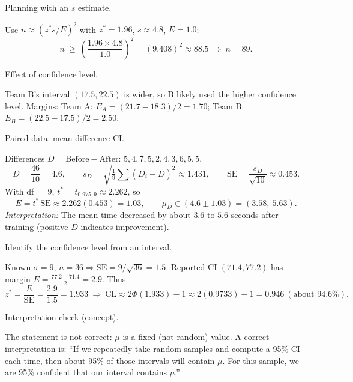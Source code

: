 \documentclass[11pt]{article}
\def\textbf#1{#1}%
\begin{document}
\begin{solution}
\textbf{Planning with an $s$ estimate.}

Use $n\approx (z^{\ast}s/E)^2$ with $z^{\ast}=1.96$, $s\approx 4.8$, $E=1.0$:
\[
n\ \ge\ \left(\frac{1.96\times 4.8}{1.0}\right)^2=(9.408)^2\approx 88.5\ \Rightarrow\ \boxed{n=89}.
\]
\end{solution}

\begin{solution}
\textbf{Effect of confidence level.}

Team B’s interval $(17.5,22.5)$ is wider, so B likely used the higher confidence level.  
Margins: Team A: $E_A=(21.7-18.3)/2=\boxed{1.70}$; Team B: $E_B=(22.5-17.5)/2=\boxed{2.50}$.
\end{solution}

\begin{solution}
\textbf{Paired data: mean difference CI.}

Differences $D=\text{Before}-\text{After}$: $5,4,7,5,2,4,3,6,5,5$.
\[
\bar D=\frac{46}{10}=4.6,\qquad s_D=\sqrt{\tfrac{1}{9}\sum(D_i-\bar D)^2}\approx 1.431,\qquad
\text{SE}=\frac{s_D}{\sqrt{10}}\approx 0.453.
\]
With df $=9$, $t^{\ast}=t_{0.975,9}\approx 2.262$, so
\[
E=t^{\ast}\,\text{SE}\approx 2.262(0.453)=1.03,\qquad
\boxed{\mu_D\in (4.6\pm 1.03)=(3.58,\ 5.63)}.
\]
\emph{Interpretation:} The mean time decreased by about $3.6$ to $5.6$ seconds after training (positive $D$ indicates improvement).
\end{solution}

\begin{solution}
\textbf{Identify the confidence level from an interval.}

Known $\sigma=9$, $n=36\Rightarrow \text{SE}=9/\sqrt{36}=1.5$. Reported CI $(71.4,77.2)$ has margin $E=\tfrac{77.2-71.4}{2}=2.9$. Thus
\[
z^{\ast}=\frac{E}{\text{SE}}=\frac{2.9}{1.5}=1.933\ \Rightarrow\ 
\text{CL}\approx 2\Phi(1.933)-1\approx 2(0.9733)-1=\boxed{0.946}\ (\text{about }94.6\%).
\]
\end{solution}

\begin{solution}
\textbf{Interpretation check (concept).}

The statement is not correct: $\mu$ is a fixed (not random) value. A correct interpretation is:
“If we repeatedly take random samples and compute a 95\% CI each time, then about 95\% of those intervals will contain $\mu$. For this sample, we are 95\% confident that our interval contains $\mu$.”
\end{solution}
\end{document}
